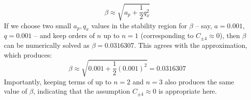 \documentclass{article}
\begin{document}
\begin{equation}
\beta \approx \sqrt{a_p + \frac{1}{2}q_x^2}	
\end{equation}
If we choose two small $a_p, q_x$ values in the stability region for $\beta$ -- say, $a = 0.001$, $q = 0.001$ -- and keep orders of $n$ up to $n = 1$ (corresponding to $C_{\pm 4} \approx 0$), then $\beta$ can be numerically solved as $\beta = 0.0316307$. This agrees with the approximation, which produces:
\begin{equation*}
\beta \approx \sqrt{0.001 + \frac{1}{2}(0.001)^2} = 0.0316307
\end{equation*}
Importantly, keeping terms of up to $n = 2$ and $n = 3$ also produces the same value of $\beta$, indicating that the assumption $C_{\pm 4} \approx 0$ is appropriate here. 
\end{document}
